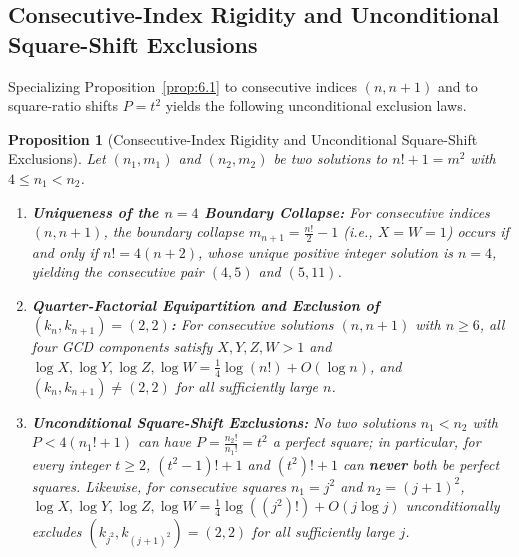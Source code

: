 \documentclass[11pt,reqno]{amsart}
\newtheorem{proposition}[theorem]{Proposition}
\theoremstyle{remark}
\numberwithin{equation}{section}
\begin{document}
\subsection{Consecutive-Index Rigidity and Unconditional Square-Shift Exclusions}
Specializing Proposition~\ref{prop:6.1} to consecutive indices $(n, n + 1)$ and to square-ratio shifts $P = t^2$ yields the following unconditional exclusion laws.

\begin{proposition}[{Consecutive-Index Rigidity and Unconditional Square-Shift Exclusions}]\label{prop:6.2}
Let $(n_1, m_1)$ and $(n_2, m_2)$ be two solutions to $n! + 1 = m^2$ with $4 \le n_1 < n_2$.
\begin{enumerate}
\item[(i)] \textbf{Uniqueness of the $n = 4$ Boundary Collapse:} For consecutive indices $(n, n + 1)$, the boundary collapse $m_{n+1} = \frac{n!}{2} - 1$ (i.e., $X = W = 1$) occurs if and only if $n! = 4(n + 2)$, whose unique positive integer solution is $n = 4$, yielding the consecutive pair $(4, 5)$ and $(5, 11)$.
\item[(ii)] \textbf{Quarter-Factorial Equipartition and Exclusion of $(k_n, k_{n+1}) = (2, 2)$:} For consecutive solutions $(n, n + 1)$ with $n \ge 6$, all four GCD components satisfy $X, Y, Z, W > 1$ and $\log X, \log Y, \log Z, \log W = \frac{1}{4}\log(n!) + O(\log n)$, and $(k_n, k_{n+1}) \ne (2, 2)$ for all sufficiently large $n$.
\item[(iii)] \textbf{Unconditional Square-Shift Exclusions:} No two solutions $n_1 < n_2$ with $P < 4(n_1! + 1)$ can have $P = \frac{n_2!}{n_1!} = t^2$ a perfect square; in particular, for every integer $t \ge 2$, $(t^2 - 1)! + 1$ and $(t^2)! + 1$ can \textbf{never} both be perfect squares. Likewise, for consecutive squares $n_1 = j^2$ and $n_2 = (j + 1)^2$, $\log X, \log Y, \log Z, \log W = \frac{1}{4}\log((j^2)!) + O(j\log j)$ unconditionally excludes $(k_{j^2}, k_{(j+1)^2}) = (2, 2)$ for all sufficiently large $j$.
\end{enumerate}
\end{proposition}
\end{document}

